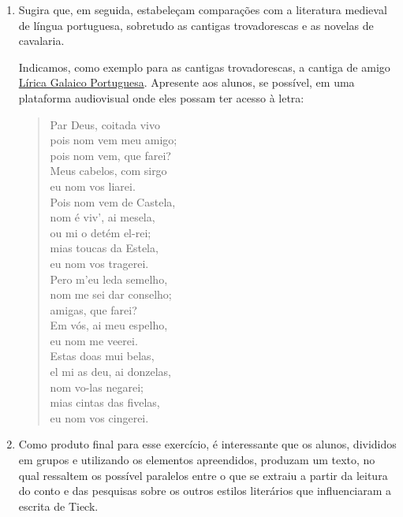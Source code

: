 \documentclass[12pt]{extarticle}
\begin{document}
\begin{enumerate}
 

\item 
Sugira que, em seguida, estabeleçam comparações com a 
literatura medieval de língua portuguesa, sobretudo as 
cantigas trovadorescas e as novelas de
cavalaria.

Indicamos, como exemplo para as cantigas trovadorescas, a cantiga de amigo 
\href{https://www.youtube.com/watch?v=1M_VcqHoQ1M&ab_channel=Am%C3%A9ricoValente}{Lírica Galaico Portuguesa}. 
Apresente aos alunos, se possível, em uma plataforma audiovisual onde eles possam 
ter acesso à letra: 

\begin{verse}
Par Deus, coitada vivo\\
pois nom vem meu amigo;\\
pois nom vem, que farei?\\
Meus cabelos, com sirgo\\
eu nom vos liarei.\\
Pois nom vem de Castela,\\
nom é viv', ai mesela,\\
ou mi o detém el-rei;\\
mias toucas da Estela,\\
eu nom vos tragerei.\\
Pero m'eu leda semelho,\\
nom me sei dar conselho;\\
amigas, que farei?\\
Em vós, ai meu espelho,\\
eu nom me veerei.\\  
Estas doas mui belas,\\
el mi as deu, ai donzelas,\\
nom vo-las negarei;\\
mias cintas das fivelas,\\
eu nom vos cingerei.\\
\end{verse}

\item 
Como produto final para esse exercício, é interessante que os alunos, divididos em
grupos e utilizando os elementos apreendidos, produzam um texto, no qual
ressaltem os possível paralelos entre o que se extraiu a partir da leitura do 
conto e das pesquisas sobre os outros estilos literários que influenciaram a 
escrita de Tieck.

\end{enumerate}
\end{document}
